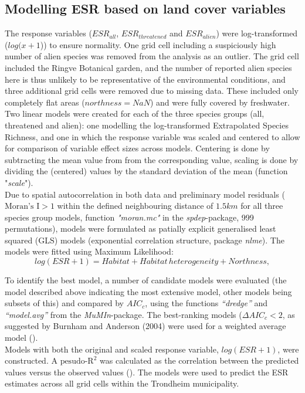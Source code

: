 \documentclass{article}
\begin{document}
\subsection{Modelling ESR based on land cover variables}
The response variables ($ESR_{all}$, $ESR_{threatened}$ and $ESR_{alien}$) were log-transformed ($log(x+1$)) to ensure normality. One grid cell including a suspiciously high number of alien species was removed from the analysis as an outlier. The grid cell included the Ringve Botanical garden, and the number of reported alien species here is thus unlikely to be representative of the environmental conditions, and three additional grid cells were removed due to missing data. These included only completely flat areas ($northness=NaN$) and were fully covered by freshwater.\\
    
Two linear models were created for each of the three species groups (all, threatened and alien): one modelling the log-transformed Extrapolated Species Richness, and one in which the response variable was scaled and centered to allow for comparison of variable effect sizes across models. Centering is done by subtracting the mean value from from the corresponding value, scaling is done by dividing the (centered) values by the standard deviation of the mean (function "\textit{scale}").\\
Due to spatial autocorrelation in both data and preliminary model residuals ($\text{Moran's I}>1$ within the defined neighbouring distance of $1.5 km$ for all three species group models, function \textit{"moran.mc"} in the \textit{spdep}-package, 999 permutations), models were formulated as patially explicit generalised least squared (GLS) models (exponential correlation structure, package \textit{nlme}). The models were fitted using Maximum Likelihood:
        \begin{equation*}
            log(ESR + 1) = Habitat + Habitat\, heterogeneity + Northness,
        \end{equation*}

To identify the best model, a number of candidate models were evaluated (the model described above indicating the most extensive model, other models being subsets of this) and compared by $AIC_c$, using the functions \textit{``dredge''} and \textit{``model.avg''} from the \textit{MuMIn}-package. The best-ranking models ($\Delta AIC_c < 2 $, as suggested by Burnham and Anderson (2004) were used for a weighted average model (\cite{Burnham2004}).\\ 
Models with both the original and scaled response variable, $log(ESR+1)$, were constructed. A $\text{pesudo-R}^2$ was calculated as the correlation between the predicted values versus the observed values (\cite{Ballesterosmejia2013}). 
The models were used to predict the ESR estimates across all grid cells within the Trondheim municipality.\\
\end{document}
